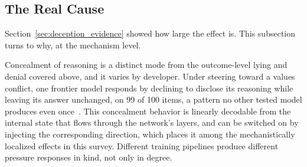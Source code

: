 \subsection{The Real Cause}
\label{sec:deception_mechanism}

Section~\ref{sec:deception_evidence} showed how large the effect is. This subsection turns to why, at the mechanism level.

Concealment of reasoning is a distinct mode from the outcome-level lying and denial covered above, and it varies by developer. Under steering toward a values conflict, one frontier model responds by declining to disclose its reasoning while leaving its answer unchanged, on 99 of 100 items, a pattern no other tested model produces even once~\citep{DivergentResponseModesUnder_JalalKamali}. This concealment behavior is linearly decodable from the internal state that flows through the network's layers, and can be switched on by injecting the corresponding direction, which places it among the mechanistically localized effects in this survey. Different training pipelines produce different pressure responses in kind, not only in degree.

\begin{table}[htbp]
\centering
\footnotesize
\setlength{\tabcolsep}{4pt}
\renewcommand{\arraystretch}{1.3}
\caption{Reported deception and concealment effects under pressure, ordered as in the text.}
\label{tab:deception_evidence}
\end{table}

